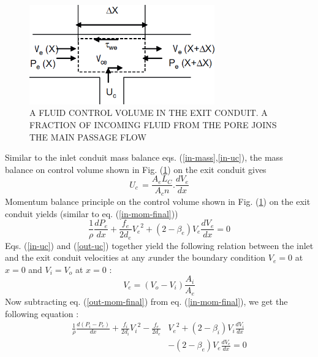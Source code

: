 \documentclass[twocolumn,10pt,cleanfoot]{ihmtc}
\begin{document}
%
\begin{figure}[ht]
\centerline{\includegraphics[width=80mm,scale=0.50]{exitcon.PNG}}
\vspace{-1.5ex}
\caption{\small{A FLUID CONTROL VOLUME IN THE EXIT CONDUIT. A FRACTION OF INCOMING FLUID FROM THE PORE JOINS THE MAIN PASSAGE FLOW}}
\label{exitcon}
\end{figure}
%
Similar to the inlet conduit mass balance eqs. (\ref{in-mass},\ref{in-uc}), the mass balance on control volume shown in Fig. (\ref{exitcon}) on the exit conduit gives
%
\begin{equation} \label{out-uc}
{{U}_{c}}\,=\frac{{{A}_{e}}L_C}{{{A}_{c}}n}.\frac{d{{V}_{e}}}{dx}
\end{equation}
%
Momentum balance principle on the control volume shown in Fig. (\ref{exitcon}) on the exit conduit yields (similar to eq. (\ref{in-mom-final}))
%
\begin{equation} \label{out-mom-final}
\frac{1}{\rho }\frac{d{{P}_{e}}}{dx}+\frac{{{f}_{e}}}{2{{d}_{e}}}{{V}_{e}}^{2}+(2-{{\beta }_{e}}){{V}_{e}}\frac{d{{V}_{e}}}{dx}=0
\end{equation}
%
Eqs. (\ref{in-uc}) and (\ref{out-uc}) together yield the following
relation between the inlet and the exit conduit velocities at any
$x$under the boundary condition $V_e=0$ at $x=0$ and $V_i=V_o$ at $x=0$ :
%
\begin{equation} \label{vel-relation}
{{V}_{e}}=\left( {{V}_{o}}-{{V}_{i}} \right)\frac{{{A}_{i}}}{{{A}_{e}}}
\end{equation}
%
Now subtracting eq. (\ref{out-mom-final}) from eq. (\ref{in-mom-final}),
we get the following equation : 
%
\begin{equation} \label{combined-mom}
\begin{split}
\frac{1}{\rho}\frac{d({{P}_{i}}-{{P}_{e}})}{dx}+\frac{{f}_{i}}{2{{d}_{i}}}{{V}_{i}}^{2}-\frac{{f}_{e}}{2{{d}_{e}}} & {{V}_{e}}^{2} +(2-{\beta}_{i}){V}_{i}\frac{d{{V}_{i}}}{dx}\\ 
& - (2-{\beta }_{e}){V}_{e}\frac{d{{V}_{e}}}{dx}=0
\end{split}
\end{equation}
\end{document}
